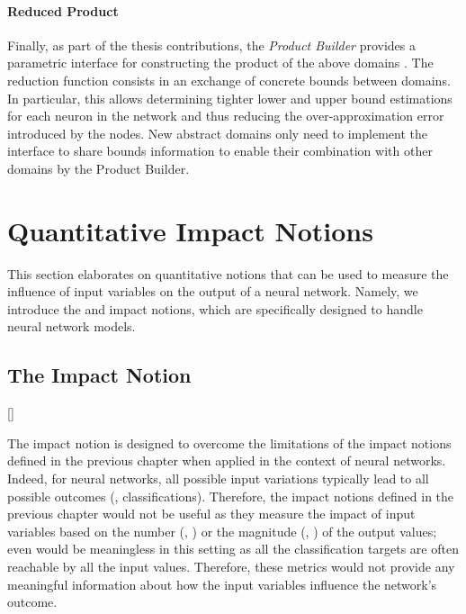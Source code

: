 \paragraph{Reduced Product}

Finally, as part of the thesis contributions, the \emph{Product Builder}  provides a parametric interface for constructing the product of the above domains .
The reduction function consists in an exchange of concrete bounds between domains. In particular, this allows determining tighter lower and upper bound estimations for each neuron in the network and thus reducing the over-approximation error introduced by the \relu{} nodes.
New abstract domains only need to implement the interface to share bounds information to enable their combination with other domains by the Product Builder.



\section{Quantitative Impact Notions}

This section elaborates on quantitative notions that can be used to measure the influence of input variables on the output of a neural network.
Namely, we introduce the \changesname{} and \qlibraname{} impact notions, which are specifically designed to handle neural network models.

\subsection{The \changesname{} Impact Notion}[\changesname]


The \changesname{} impact notion is designed to overcome the limitations of the impact notions defined in the previous chapter when applied in the context of neural networks.
Indeed, for neural networks, all possible input variations typically lead to all possible outcomes (\ie, classifications).
Therefore, the impact notions defined in the previous chapter would not be useful as they measure the impact of input variables based on the number (\eg, \outcomesname{}) or the magnitude (\eg, \rangename{}) of the output values; even \qusedname{} would be meaningless in this setting as all the classification targets are often reachable by all the input values.
Therefore, these metrics would not provide any meaningful information about how the input variables influence the network's outcome.

